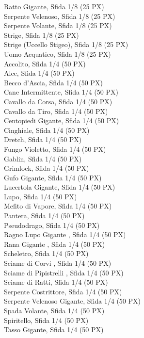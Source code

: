 \begin{multicols}{3}
{Ratto Gigante, Sfida 1/8 (25 PX)\\
Serpente Velenoso, Sfida 1/8 (25 PX)\\
Serpente Volante, Sfida 1/8 (25 PX)\\
Strige, Sfida 1/8 (25 PX)\\
Strige (Uccello Stigeo), Sfida 1/8 (25 PX)\\
Uomo Acquatico, Sfida 1/8 (25 PX)\\
Accolito, Sfida 1/4 (50 PX)\\
Alce, Sfida 1/4 (50 PX)\\
Becco d'Ascia, Sfida 1/4 (50 PX)\\
Cane Intermittente, Sfida 1/4 (50 PX)\\
Cavallo da Corsa, Sfida 1/4 (50 PX)\\
Cavallo da Tiro, Sfida 1/4 (50 PX)\\
Centopiedi Gigante, Sfida 1/4 (50 PX)\\
Cinghiale, Sfida 1/4 (50 PX)\\
Dretch, Sfida 1/4 (50 PX)\\
Fungo Violetto, Sfida 1/4 (50 PX)\\
Gablin, Sfida 1/4 (50 PX)\\
Grimlock, Sfida 1/4 (50 PX)\\
Gufo Gigante, Sfida 1/4 (50 PX)\\
Lucertola Gigante, Sfida 1/4 (50 PX)\\
Lupo, Sfida 1/4 (50 PX)\\
Mefito di Vapore, Sfida 1/4 (50 PX)\\
Pantera, Sfida 1/4 (50 PX)\\
Pseudodrago, Sfida 1/4 (50 PX)\\
Ragno Lupo Gigante  , Sfida 1/4 (50 PX)\\
Rana Gigante  , Sfida 1/4 (50 PX)\\
Scheletro, Sfida 1/4 (50 PX)\\
Sciame di Corvi  , Sfida 1/4 (50 PX)\\
Sciame di Pipistrelli  , Sfida 1/4 (50 PX)\\
Sciame di Ratti, Sfida 1/4 (50 PX)\\
Serpente Costrittore, Sfida 1/4 (50 PX)\\
Serpente Velenoso Gigante, Sfida 1/4 (50 PX)\\
Spada Volante, Sfida 1/4 (50 PX)\\
Spiritello, Sfida 1/4 (50 PX)\\
Tasso Gigante, Sfida 1/4 (50 PX)\\
}
\end{multicols}
